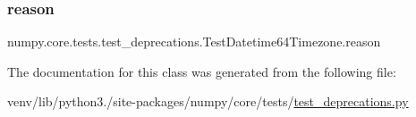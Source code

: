 \subsubsection{\texorpdfstring{reason}{reason}}
{\footnotesize\ttfamily numpy.\+core.\+tests.\+test\+\_\+deprecations.\+Test\+Datetime64\+Timezone.\+reason\hspace{0.3cm}{\ttfamily [static]}}



The documentation for this class was generated from the following file\+:\begin{DoxyCompactItemize}
\item 
venv/lib/python3./site-\/packages/numpy/core/tests/\hyperlink{core_2tests_2test__deprecations_8py}{test\+\_\+deprecations.\+py}\end{DoxyCompactItemize}
